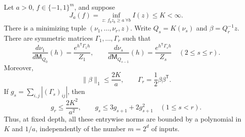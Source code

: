 \begin{theorem}
\label{thm:critical-quadratic-tilts}\label{thm:critical-tilts}
Let $a>0$, $f\in\{-1,1\}^m$, and suppose
\[
 J_a(f)=\inf_{z:\ f_bz_b\geq a\ \forall b}I(z)\leq K<\infty.
\]
There is a minimizing tuple $(\nu_1,\ldots,\nu_r,z)$.
Write $Q_s=K(\nu_s)$ and $\beta=Q_r^{-1}z$.
There are symmetric matrices $\Gamma_1,\ldots,\Gamma_r$ such that
\begin{equation}\label{eq:critical-quadratic-tilts}
 \frac{d\nu_1}{d\mathsf M_{Q_0}}(h)
   =\frac{e^{h^{\mathsf T}\Gamma_1h}}{Z_1},\qquad
 \frac{d\nu_s}{d\mathsf M_{Q_{s-1}}}(h)
   =\frac{e^{h^{\mathsf T}\Gamma_sh}}{Z_s}\quad(2\leq s\leq r).
\end{equation}
Moreover,
\begin{equation}\label{eq:critical-beta-bound}
 \|\beta\|_1\leq\frac{2K}{a},\qquad
 \Gamma_r=\frac12\beta\beta^{\mathsf T}.
\end{equation}
If $g_s=\sum_{i,j}|(\Gamma_s)_{ij}|$, then
\begin{equation}\label{eq:critical-gamma-recursion}
 g_r\leq\frac{2K^2}{a^2},\qquad
 g_s\leq3g_{s+1}+2g_{s+1}^2\quad(1\leq s<r).
\end{equation}
Thus, at fixed depth, all these entrywise norms are bounded by a polynomial
in $K$ and $1/a$, independently of the number $m=2^d$ of inputs.
\end{theorem}

